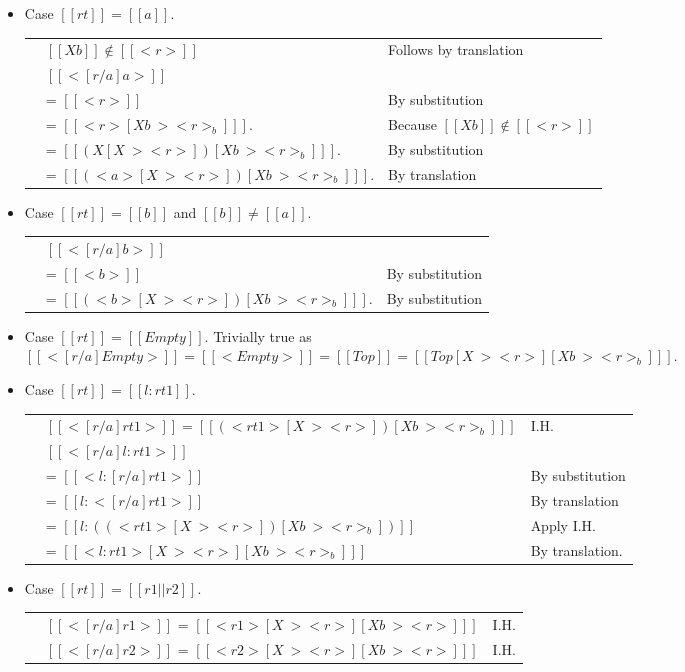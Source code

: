 \begin{itemize}
\begin{longtable}[l]{ll|l}
  \end{longtable}
\item Case $[[rt]] = [[a]]$.
  \begin{longtable}[l]{ll|l}
    & $[[Xb]] \notin [[<r>]]$ & Follows by translation \\
    & $[[ <[r / a] a> ]]$ & \\
    & = $[[<r>]]$ & By substitution \\
    & = $ [[ <r> [Xb ~> <r>_b] ]] $. & Because $[[Xb]] \notin [[<r>]]$ \\
    & = $ [[ (X [X ~> <r>]) [Xb ~> <r>_b] ]] $. & By substitution \\
    & = $ [[ (<a> [X ~> <r>]) [Xb ~> <r>_b] ]] $. & By translation \\
  \end{longtable}
\item Case $[[rt]] = [[b]]$ and $[[b]] \neq [[a]]$.
  \begin{longtable}[l]{ll|l}
    & $[[ <[r / a] b> ]]$ & \\
    & = $[[<b>]]$ & By substitution \\
    & = $ [[ (<b> [X ~> <r>]) [Xb ~> <r>_b] ]] $. & By substitution \\
  \end{longtable}
\item Case $[[rt]] = [[Empty]]$. Trivially true as
  $ [[ <[r/a] Empty> ]]
  = [[ <Empty> ]]
  = [[ Top ]]
  = [[ Top [X ~> <r>] [Xb ~> <r>_b] ]]
  $.
\item Case $[[rt]] = [[{l:rt1}]]$.
  \begin{longtable}[l]{ll|l}
    & $[[ <[r / a] rt1> ]] = [[ (<rt1> [X ~> <r>]) [Xb ~> <r>_b] ]]$  & I.H.\\
    & $[[ <[r / a] {l:rt1}> ]]$& \\
    & = $[[ <{l: [r/a]rt1}> ]]$&  By substitution\\
    & = $[[ {l: <[r/a]rt1>} ]]$&  By translation\\
    & = $[[ { l: ((<rt1> [X ~> <r>]) [Xb ~> <r>_b])  } ]]$&  Apply I.H. \\
    & = $[[ <{l: rt1}> [X ~> <r>] [Xb ~> <r>_b] ]]$&  By translation. \\
  \end{longtable}
\item Case $[[rt]] = [[r1 ||  r2]]$.
  \begin{longtable}[l]{ll|l}
    & $[[ <[r / a] r1> ]]$ = $ [[ <r1>[X ~> <r>] [Xb ~> <r>] ]] $ & I.H. \\
    & $[[ <[r / a] r2> ]]$ = $ [[ <r2> [X ~> <r>][Xb ~> <r>] ]] $ & I.H. \\

\end{longtable}
\end{itemize}
